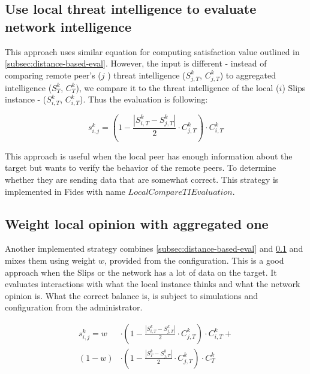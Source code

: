 \subsection{Use local threat intelligence to evaluate network intelligence}
\label{subsec:use-local-threat-to-evaluate}
This approach uses similar equation for computing satisfaction value outlined in \ref{subsec:distance-based-eval}. However, the input is different - instead of comparing remote peer's ($j$ ) threat intelligence ($S^{k}_{j, T}$, $C^{k}_{j, T}$) to aggregated intelligence ($S^{k}_{T}$, $C^{k}_{T}$), we compare it to the threat intelligence of the local ($i$) Slips instance - ($S^{k}_{i, T}$, $C^{k}_{i, T}$). Thus the evaluation is following:

\begin{equation}
s^{k}_{i, j} = \left(1 - \frac{|{S}^{k}_{i, T} - S^{k}_{j, T}|}{2} \cdot C^{k}_{j, T}\right) \cdot C^{k}_{i, T}
\end{equation}

This approach is useful when the local peer has enough information about the target but wants to verify the behavior of the remote peers.
To determine whether they are sending data that are somewhat correct. This strategy is implemented in Fides with name $LocalCompareTIEvaluation$.

\subsection{Weight local opinion with aggregated one}
\label{subsec:weight-local-opinion-with-aggregated-one}
Another implemented strategy combines \ref{subsec:distance-based-eval} and \ref{subsec:use-local-threat-to-evaluate} and mixes them using weight $w$, provided from the configuration.
This is a good approach when the Slips or the network has a lot of data on the target. It evaluates interactions with what the local instance thinks and what the network opinion is.
What the correct balance is,  is subject to simulations and configuration from the administrator.

\begin{equation}
\begin{split}
    s^{k}_{i, j} = w &\cdot \left(1 - \frac{|{S}^{k}_{i, T} - S^{k}_{j, T}|}{2} \cdot C^{k}_{j, T}\right) \cdot C^{k}_{i, T} + \\
    (1-w) &\cdot \left(1 - \frac{|{S}^{k}_{T} - S^{k}_{j, T}|}{2} \cdot C^{k}_{j, T}\right) \cdot C^{k}_{T}
\end{split}
\end{equation}

